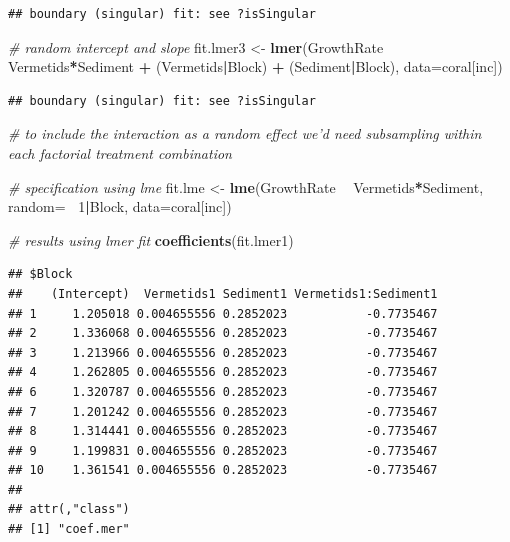 \documentclass[]{book}
\newenvironment{Shaded}{\begin{snugshade}}{\end{snugshade}}
\newcommand{\KeywordTok}[1]{\textcolor[rgb]{0.13,0.29,0.53}{\textbf{#1}}}
\newcommand{\DataTypeTok}[1]{\textcolor[rgb]{0.13,0.29,0.53}{#1}}
\newcommand{\DecValTok}[1]{\textcolor[rgb]{0.00,0.00,0.81}{#1}}
\newcommand{\StringTok}[1]{\textcolor[rgb]{0.31,0.60,0.02}{#1}}
\newcommand{\CommentTok}[1]{\textcolor[rgb]{0.56,0.35,0.01}{\textit{#1}}}
\newcommand{\OperatorTok}[1]{\textcolor[rgb]{0.81,0.36,0.00}{\textbf{#1}}}
\newcommand{\NormalTok}[1]{#1}
\begin{document}
\begin{verbatim}
## boundary (singular) fit: see ?isSingular
\end{verbatim}

\begin{Shaded}
\begin{Highlighting}[]
\CommentTok{# random intercept and slope}
\NormalTok{fit.lmer3 <-}\StringTok{ }\KeywordTok{lmer}\NormalTok{(GrowthRate }\OperatorTok{~}\StringTok{ }\NormalTok{Vermetids}\OperatorTok{*}\NormalTok{Sediment }\OperatorTok{+}\StringTok{ }\NormalTok{(Vermetids}\OperatorTok{|}\NormalTok{Block) }\OperatorTok{+}\StringTok{ }\NormalTok{(Sediment}\OperatorTok{|}\NormalTok{Block), }\DataTypeTok{data=}\NormalTok{coral[inc])}
\end{Highlighting}
\end{Shaded}

\begin{verbatim}
## boundary (singular) fit: see ?isSingular
\end{verbatim}

\begin{Shaded}
\begin{Highlighting}[]
\CommentTok{# to include the interaction as a random effect we'd need subsampling within each factorial treatment combination}

\CommentTok{# specification using lme}
\NormalTok{fit.lme <-}\StringTok{ }\KeywordTok{lme}\NormalTok{(GrowthRate }\OperatorTok{~}\StringTok{ }\NormalTok{Vermetids}\OperatorTok{*}\NormalTok{Sediment, }\DataTypeTok{random=} \OperatorTok{~}\DecValTok{1}\OperatorTok{|}\NormalTok{Block, }\DataTypeTok{data=}\NormalTok{coral[inc])}

\CommentTok{# results using lmer fit}
\KeywordTok{coefficients}\NormalTok{(fit.lmer1)}
\end{Highlighting}
\end{Shaded}

\begin{verbatim}
## $Block
##    (Intercept)  Vermetids1 Sediment1 Vermetids1:Sediment1
## 1     1.205018 0.004655556 0.2852023           -0.7735467
## 2     1.336068 0.004655556 0.2852023           -0.7735467
## 3     1.213966 0.004655556 0.2852023           -0.7735467
## 4     1.262805 0.004655556 0.2852023           -0.7735467
## 6     1.320787 0.004655556 0.2852023           -0.7735467
## 7     1.201242 0.004655556 0.2852023           -0.7735467
## 8     1.314441 0.004655556 0.2852023           -0.7735467
## 9     1.199831 0.004655556 0.2852023           -0.7735467
## 10    1.361541 0.004655556 0.2852023           -0.7735467
## 
## attr(,"class")
## [1] "coef.mer"
\end{verbatim}
\end{document}

